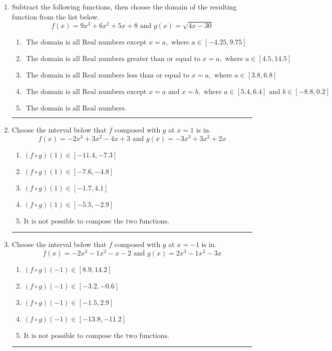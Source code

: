 \documentclass[14pt]{extbook}
\newcommand{\litem}[1]{\item#1\hspace*{-1cm}\rule{\textwidth}{0.4pt}}
\begin{document}
\begin{enumerate}
{\begin{enumerate}[label=\Alph*.]
\end{enumerate} }
\litem{
Subtract the following functions, then choose the domain of the resulting function from the list below.\[ f(x) = 9x^{3} +6 x^{2} +5 x + 8 \text{ and } g(x) = \sqrt{4x-30}  \]\begin{enumerate}[label=\Alph*.]
\item \( \text{ The domain is all Real numbers except } x = a, \text{ where } a \in [-4.25, 9.75] \)
\item \( \text{ The domain is all Real numbers greater than or equal to } x = a, \text{ where } a \in [4.5, 14.5] \)
\item \( \text{ The domain is all Real numbers less than or equal to } x = a, \text{ where } a \in [3.8, 6.8] \)
\item \( \text{ The domain is all Real numbers except } x = a \text{ and } x = b, \text{ where } a \in [5.4, 6.4] \text{ and } b \in [-8.8, 0.2] \)
\item \( \text{ The domain is all Real numbers. } \)

\end{enumerate} }
\litem{
Choose the interval below that $f$ composed with $g$ at $x=1$ is in.\[ f(x) = -2x^{3} +3 x^{2} -4 x + 3 \text{ and } g(x) = -3x^{3} +3 x^{2} +2 x \]\begin{enumerate}[label=\Alph*.]
\item \( (f \circ g)(1) \in [-11.4, -7.3] \)
\item \( (f \circ g)(1) \in [-7.6, -4.8] \)
\item \( (f \circ g)(1) \in [-1.7, 4.1] \)
\item \( (f \circ g)(1) \in [-5.5, -2.9] \)
\item \( \text{It is not possible to compose the two functions.} \)

\end{enumerate} }
\litem{
Choose the interval below that $f$ composed with $g$ at $x=-1$ is in.\[ f(x) = -2x^{3} -1 x^{2} -x -2 \text{ and } g(x) = 2x^{3} -1 x^{2} -3 x \]\begin{enumerate}[label=\Alph*.]
\item \( (f \circ g)(-1) \in [8.9, 14.2] \)
\item \( (f \circ g)(-1) \in [-3.2, -0.6] \)
\item \( (f \circ g)(-1) \in [-1.5, 2.9] \)
\item \( (f \circ g)(-1) \in [-13.8, -11.2] \)
\item \( \text{It is not possible to compose the two functions.} \)


\end{enumerate}}
\end{enumerate}
\end{document}
